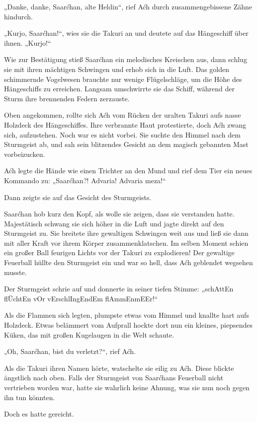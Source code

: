 „Danke, danke, Saarćhan, alte Heldin“, rief Aćh durch zusammengebissene Zähne hindurch.

„Kurjo, Saarćhan!“, wies sie die Takuri an und deutete auf das Hängeschiff über ihnen. „Kurjo!“

Wie zur Bestätigung stieß Saarćhan ein melodisches Kreischen aus, dann schlug sie mit ihren mächtigen Schwingen und erhob sich in die Luft. Das golden schimmernde Vogelwesen brauchte nur wenige Flügelschläge, um die Höhe des Hängeschiffs zu erreichen. Langsam umschwirrte sie das Schiff, während der Sturm ihre brennenden Federn zerzauste.

Oben angekommen, rollte sich Aćh vom Rücken der uralten Takuri aufs nasse Holzdeck des Hängeschiffes. Ihre verbrannte Haut protestierte, doch Aćh zwang sich, aufzustehen. Noch war es nicht vorbei. Sie suchte den Himmel nach dem Sturmgeist ab, und sah sein blitzendes Gesicht an dem magisch gebannten Mast vorbeizucken.

Aćh legte die Hände wie einen Trichter an den Mund und rief dem Tier ein neues Kommando zu: „Saarćhan?! Advaria! Advaria meza!“

Dann zeigte sie auf das Gesicht des Sturmgeists.

Saarćhan hob kurz den Kopf, als wolle sie zeigen, dass sie verstanden hatte. Majestätisch schwang sie sich höher in die Luft und jagte direkt auf den Sturmgeist zu. Sie breitete ihre gewaltigen Schwingen weit aus und ließ sie dann mit aller Kraft vor ihrem Körper zusammenklatschen. Im selben Moment schien ein großer Ball feurigen Lichts vor der Takuri zu explodieren! Der gewaltige Feuerball hüllte den Sturmgeist ein und war so hell, dass Aćh geblendet wegsehen musste.

Der Sturmgeist schrie auf und donnerte in seiner tiefen Stimme: „schAttEn flÜchtEn vOr vErschlIngEndEm flAmmEnmEEr!“

Als die Flammen sich legten, plumpste etwas vom Himmel und knallte hart aufs Holzdeck. Etwas belämmert vom Aufprall hockte dort nun ein kleines, piepsendes Küken, das mit großen Kugelaugen in die Welt schaute.

„Oh, Saarćhan, bist du verletzt?“, rief Aćh.

Als die Takuri ihren Namen hörte, watschelte sie eilig zu Aćh. Diese blickte ängstlich nach oben. Falls der Sturmgeist von Saarćhans Feuerball nicht vertrieben worden war, hatte sie wahrlich keine Ahnung, was sie nun noch gegen ihn tun könnten.

Doch es hatte gereicht.

